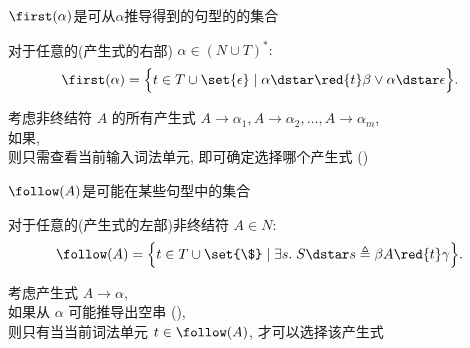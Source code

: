 \begin{frame}{}
  \begin{center}

    \vspace{0.60cm}
    $\first(\alpha)$是可从$\alpha$推导得到的句型的的集合
    \begin{definition}
      对于任意的(产生式的右部) $\alpha \in (N \cup T)^{\ast}:$
      \[
        \first(\alpha) = \Big\{t \in T \cup \set{\epsilon}
          \mid \alpha \dstar \red{t}\beta \lor \alpha \dstar \epsilon \Big\}.
      \]
    \end{definition}

    \pause
    \vspace{0.60cm}
    考虑非终结符 $A$ 的所有产生式
    $A \to \alpha_{1}, A \to \alpha_{2}, \dots, A \to \alpha_{m}$, \\[4pt]
    如果, \\[4pt]
    则只需查看当前输入词法单元, 即可确定选择哪个产生式 ()
  \end{center}
\end{frame}

\begin{frame}{}
  \begin{center}

    \vspace{0.60cm}
    $\follow(A)$是可能在某些句型中的集合
    \begin{definition}[$\follow(A)$集合]
        对于任意的(产生式的左部)非终结符 $A \in N:$
        \[
          \follow(A) = \Big\{t \in T \cup \set{\$}
            \mid \exists s.\; S \dstar s \triangleq \beta A\red{t} \gamma\Big\}.
        \]
    \end{definition}

    \pause
    \vspace{0.60cm}
    考虑产生式 $A \to \alpha$, \\[4pt]
    如果从 $\alpha$ 可能推导出空串 (\red{$\alpha \dstar \epsilon$}), \\[4pt]
    则只有当当前词法单元 $t \in \follow(A)$, 才可以选择该产生式
  \end{center}
\end{frame}

\begin{frame}{}
  \begin{center}

    

    \pause
  \end{center}
\end{frame}

